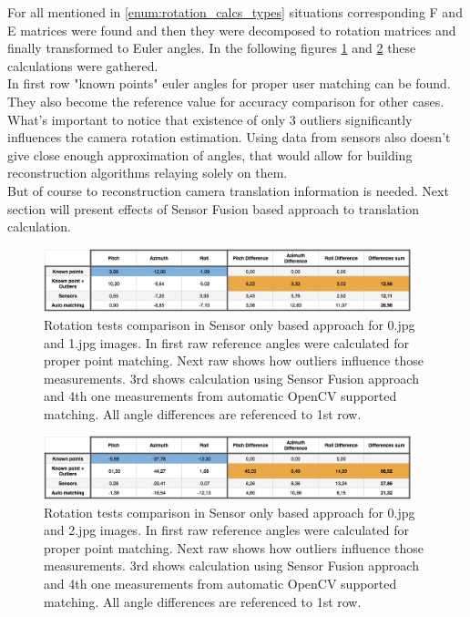 For all mentioned in \ref{enum:rotation_calcs_types} situations corresponding F and E matrices were found and then they were decomposed to rotation matrices and finally transformed to Euler angles. In the following figures \ref{fig:rot_tests_01} and \ref{fig:rot_tests_02} these calculations were gathered. \\
In first row "known points" euler angles for proper user matching can be found. They also become the reference value for accuracy comparison for other cases. \\
What's important to notice that existence of only 3 outliers significantly influences the camera rotation estimation. Using data from sensors also doesn't give close enough approximation of angles, that would allow for building reconstruction algorithms relaying solely on them. \\
But of course to reconstruction camera translation information is needed. Next section will present effects of Sensor Fusion based approach to translation calculation.
\begin{figure}[h!]
    \centering
    \includegraphics[width=0.95\textwidth]{rot_tests_01}
    \caption[Rotation tests comparison in Sensor only based approach - 1st example]{Rotation tests comparison in Sensor only based approach for 0.jpg and 1.jpg images. In first raw reference angles were calculated for proper point matching. Next raw shows how outliers influence those measurements. 3rd shows calculation using Sensor Fusion approach and 4th one measurements from automatic OpenCV supported matching. All angle differences are referenced to 1st row.}
    \label{fig:rot_tests_01}
\end{figure}
\begin{figure}[h!]
    \centering
    \includegraphics[width=0.95\textwidth]{rot_tests_02}
    \caption[Rotation tests comparison in Sensor only based approach -2nd example]{Rotation tests comparison in Sensor only based approach for 0.jpg and 2.jpg images. In first raw reference angles were calculated for proper point matching. Next raw shows how outliers influence those measurements. 3rd shows calculation using Sensor Fusion approach and 4th one measurements from automatic OpenCV supported matching. All angle differences are referenced to 1st row.}
    \label{fig:rot_tests_02}
\end{figure}

